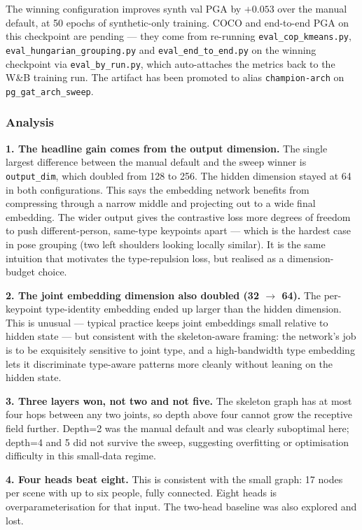 \vspace{0.5em}

The winning configuration improves synth val PGA by $+0.053$ over the manual default, at 50 epochs of synthetic-only training.
COCO and end-to-end PGA on this checkpoint are pending --- they come from re-running \texttt{eval\_cop\_kmeans.py}, \texttt{eval\_hungarian\_grouping.py} and \texttt{eval\_end\_to\_end.py} on the winning checkpoint via \texttt{eval\_by\_run.py}, which auto-attaches the metrics back to the W\&B training run.
The artifact has been promoted to alias \texttt{champion-arch} on \texttt{pg\_gat\_arch\_sweep}.

\subsubsection{Analysis}

\textbf{1. The headline gain comes from the output dimension.} The single largest difference between the manual default and the sweep winner is \texttt{output\_dim}, which doubled from 128 to 256. The hidden dimension stayed at 64 in both configurations. This says the embedding network benefits from compressing through a narrow middle and projecting out to a wide final embedding. The wider output gives the contrastive loss more degrees of freedom to push different-person, same-type keypoints apart --- which is the hardest case in pose grouping (two left shoulders looking locally similar). It is the same intuition that motivates the type-repulsion loss, but realised as a dimension-budget choice.

\textbf{2. The joint embedding dimension also doubled (32 $\rightarrow$ 64).} The per-keypoint type-identity embedding ended up larger than the hidden dimension. This is unusual --- typical practice keeps joint embeddings small relative to hidden state --- but consistent with the skeleton-aware framing: the network's job is to be exquisitely sensitive to joint type, and a high-bandwidth type embedding lets it discriminate type-aware patterns more cleanly without leaning on the hidden state.

\textbf{3. Three layers won, not two and not five.} The skeleton graph has at most four hops between any two joints, so depth above four cannot grow the receptive field further. Depth=2 was the manual default and was clearly suboptimal here; depth=4 and 5 did not survive the sweep, suggesting overfitting or optimisation difficulty in this small-data regime.

\textbf{4. Four heads beat eight.} This is consistent with the small graph: 17 nodes per scene with up to six people, fully connected. Eight heads is overparameterisation for that input. The two-head baseline was also explored and lost.

